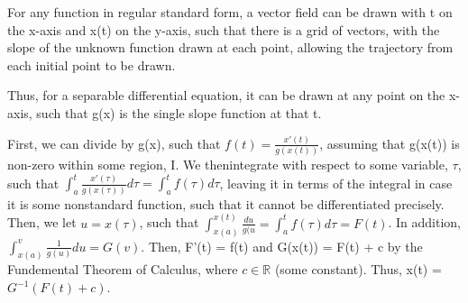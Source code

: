 \documentclass[11 pt, twoside]{article}
\begin{document}
For any function in regular standard form, a vector field can be drawn with t on the x-axis and x(t) on the y-axis, such that there is a grid of vectors, with the slope of the unknown function drawn at each point, allowing the trajectory from each initial point to be drawn.

Thus, for a separable differential equation, it can be drawn at any point on the x-axis, such that g(x) is the single slope function at that t.

First, we can divide by g(x), such that $f(t) = \frac{x'(t)}{g(x(t))}$, assuming that g(x(t)) is non-zero within some region, I. We thenintegrate with respect to some variable, $\tau$, such that $\int^t_a \frac{x'(\tau)}{g(x(\tau))}d\tau = \int^t_a f(\tau)d\tau$, leaving it in terms of the integral in case it is some nonstandard function, such that it cannot be differentiated precisely. Then, we let $u = x(\tau)$, such that $\int^{x(t)}_{x(a)} \frac{du}{g(u} = \int^t_a f(\tau)d\tau = F(t)$. In addition, $\int^v_{x(a)} \frac{1}{g(u)}du = G(v)$. Then, F'(t) = f(t) and G(x(t)) = F(t) + c by the Fundemental Theorem of Calculus, where $c \in \mathbb{R}$ (some constant). Thus, x(t) = $G^{-1}(F(t) + c)$.
\end{document}
